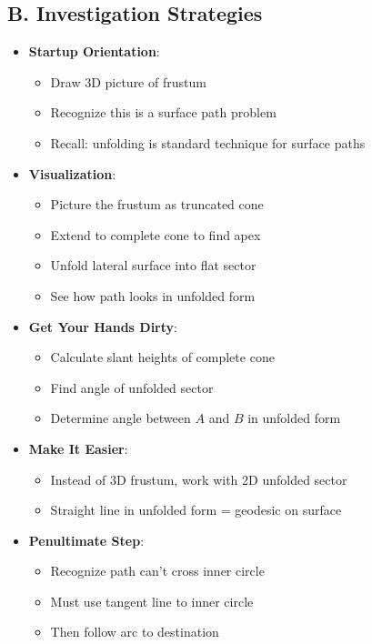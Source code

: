 \documentclass[12pt]{article}
\begin{document}
\begin{strategicbox}
\subsection*{B. Investigation Strategies}
\begin{itemize}[leftmargin=*]
    \item \textbf{Startup Orientation}: 
    \begin{itemize}
        \item Draw 3D picture of frustum
        \item Recognize this is a surface path problem
        \item Recall: unfolding is standard technique for surface paths
    \end{itemize}
    \item \textbf{Visualization}: 
    \begin{itemize}
        \item Picture the frustum as truncated cone
        \item Extend to complete cone to find apex
        \item Unfold lateral surface into flat sector
        \item See how path looks in unfolded form
    \end{itemize}
    \item \textbf{Get Your Hands Dirty}: 
    \begin{itemize}
        \item Calculate slant heights of complete cone
        \item Find angle of unfolded sector
        \item Determine angle between $A$ and $B$ in unfolded form
    \end{itemize}
    \item \textbf{Make It Easier}: 
    \begin{itemize}
        \item Instead of 3D frustum, work with 2D unfolded sector
        \item Straight line in unfolded form = geodesic on surface
    \end{itemize}
    \item \textbf{Penultimate Step}: 
    \begin{itemize}
        \item Recognize path can't cross inner circle
        \item Must use tangent line to inner circle
        \item Then follow arc to destination
    \end{itemize}
\end{itemize}


\end{strategicbox}
\end{document}
